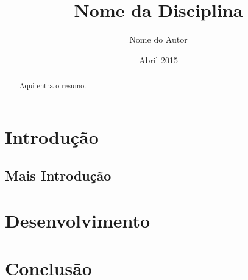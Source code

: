 \documentclass{tufte-handout}
\author{Nome do Autor}
\title{Nome da Disciplina}
\date{Abril 2015}
\begin{document}
\maketitle
\begin{abstract}
Aqui entra o resumo.
\end{abstract}

\section{Introdução}
\subsection{Mais Introdução}
\section{Desenvolvimento}

\section{Conclusão}
\end{document}
